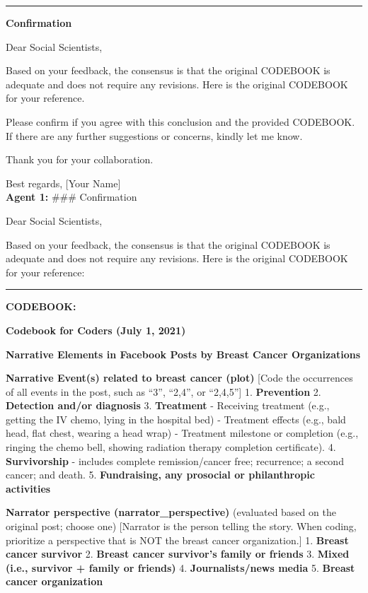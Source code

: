 \begin{center}\rule{0.5\linewidth}{0.5pt}\end{center}

\textbf{Confirmation}

Dear Social Scientists,

Based on your feedback, the consensus is that the original CODEBOOK is
adequate and does not require any revisions. Here is the original
CODEBOOK for your reference.

Please confirm if you agree with this conclusion and the provided
CODEBOOK. If there are any further suggestions or concerns, kindly let
me know.

Thank you for your collaboration.

Best regards, {[}Your Name{]}\\

\textbf{Agent 1:} \#\#\# Confirmation

Dear Social Scientists,

Based on your feedback, the consensus is that the original CODEBOOK is
adequate and does not require any revisions. Here is the original
CODEBOOK for your reference:

\begin{center}\rule{0.5\linewidth}{0.5pt}\end{center}

\textbf{CODEBOOK:}

\textbf{Codebook for Coders (July 1, 2021)}

\textbf{Narrative Elements in Facebook Posts by Breast Cancer
Organizations}

\textbf{Narrative Event(s) related to breast cancer (plot)} {[}Code the
occurrences of all events in the post, such as ``3'', ``2,4'', or
``2,4,5''{]} 1. \textbf{Prevention} 2. \textbf{Detection and/or
diagnosis} 3. \textbf{Treatment} - Receiving treatment (e.g., getting
the IV chemo, lying in the hospital bed) - Treatment effects (e.g., bald
head, flat chest, wearing a head wrap) - Treatment milestone or
completion (e.g., ringing the chemo bell, showing radiation therapy
completion certificate). 4. \textbf{Survivorship} - includes complete
remission/cancer free; recurrence; a second cancer; and death. 5.
\textbf{Fundraising, any prosocial or philanthropic activities}

\textbf{Narrator perspective (narrator\_perspective)} (evaluated based
on the original post; choose one) {[}Narrator is the person telling the
story. When coding, prioritize a perspective that is NOT the breast
cancer organization.{]} 1. \textbf{Breast cancer survivor} 2.
\textbf{Breast cancer survivor's family or friends} 3. \textbf{Mixed
(i.e., survivor + family or friends)} 4. \textbf{Journalists/news media}
5. \textbf{Breast cancer organization}

